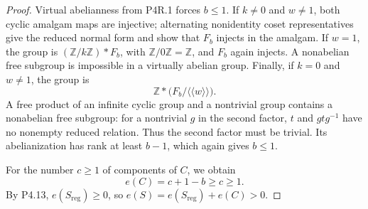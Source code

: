 \begin{proof}
Virtual abelianness from P4R.1 forces $b\le1$.
If $k\ne0$ and $w\ne1$, both cyclic amalgam maps are
injective; alternating nonidentity coset representatives
give the reduced normal form and show that $F_b$ injects
in the amalgam. If $w=1$, the group is
$(\mathbb Z/k\mathbb Z)*F_b$, with
$\mathbb Z/0\mathbb Z=\mathbb Z$, and $F_b$ again
injects. A nonabelian free subgroup is impossible in a
virtually abelian group. Finally, if $k=0$ and $w\ne1$,
the group is
\[
 \mathbb Z*\bigl(F_b/\langle\!\langle w\rangle\!\rangle\bigr).
\]
A free product of an infinite cyclic group and a nontrivial
group contains a nonabelian free subgroup: for a nontrivial
$g$ in the second factor, $t$ and $gtg^{-1}$ have no
nonempty reduced relation. Thus the second factor must
be trivial. Its abelianization has rank at least $b-1$,
which again gives $b\le1$.

For the number $c\ge1$ of components of $C$, we obtain
\[
 e(C)=c+1-b\ge c\ge1.
\]
By P4.13, $e(S_{\mathrm{reg}})\ge0$, so
$e(S)=e(S_{\mathrm{reg}})+e(C)>0$.
\end{proof}
























































